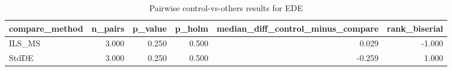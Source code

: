 \begin{table}[!t]
\centering
\caption{Pairwise control-vs-others results for EDE}
\label{tab:posthoc_holm_generated}
\begin{tabular}{lrrrrr}
\toprule
compare_method & n_pairs & p_value & p_holm & median_diff_control_minus_compare & rank_biserial \\
\midrule
ILS_MS & 3.000 & 0.250 & 0.500 & 0.029 & -1.000 \\
StdDE & 3.000 & 0.250 & 0.500 & -0.259 & 1.000 \\
\bottomrule
\end{tabular}

\end{table}
